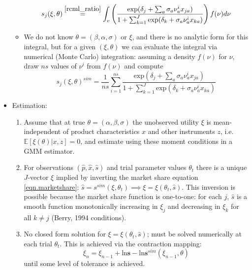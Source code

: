 \documentclass[11pt]{article}
\numberwithin{equation}{section}
\begin{document}
\begin{itemize}
\begin{itemize}
		\begin{equation}
		s_j(\xi,\theta) \overset{\eqref{rcml_ratio}}{=} \int_{v}\left(\frac{\text{exp}(\delta_j + \sum_{a}\sigma_a\nu_a^i x_{ja})}{1 + \sum_{k=1}^{J}\text{exp}(\delta_k + \sigma_a\nu_a^i x_{ka})}\right) f(\nu)d\nu
		\end{equation}
		\item 	We do not know $\theta = (\beta, \alpha, \sigma)$ or $\xi$, and there is no analytic form for this integral, but for a given $(\xi, \theta)$ we can evaluate the integral via numerical (Monte Carlo) integration: assuming a density $f(\nu)$ for $\nu$, draw $ns$ values of $\nu^i$ from $f(\nu)$ and compute
		\begin{equation}\label{eqn.marketshare}
		s_j(\xi,\theta)^{sim} = \frac{1}{ns} \sum_{i=1}^{ns}\frac{\text{exp}(\delta_j + \sum_{a}\sigma_a\nu_a^i x_{ja})}{1 + \sum_{k=1}^{J}\text{exp}(\delta_k + \sigma_a\nu_a^i x_{ka})}
		\end{equation}
	\end{itemize}
	\item Estimation:
	\begin{enumerate}
		\item Assume that at true $\theta = (\alpha, \beta, \sigma)$ the unobserved utility $\xi$ is mean-independent of product characteristics $x$ and other instruments $z$, i.e. $\mathbb{E}[\xi(\theta)|x,z]=0$, and estimate using these moment conditions in a GMM estimator.
		\item For observations $(\hat{p}, \hat{x}, \hat{s})$ and trial parameter values $\theta_t$ there is a unique $J$-vector $\xi$ implied by inverting the market share equation \ref{eqn.marketshare}: $\hat{s} = s^{sim}(\xi, \theta_t) \implies \xi = \xi(\theta_t,\hat{s})$.
    This inversion is possible because the market share function is one-to-one: for each $j$, $\hat{s}$ is a smooth function monotonically increasing in $\xi_j$ and decreasing in $\xi_k$ for all $k\neq j$ (Berry, 1994 conditions).
		\item No closed form solution for $\xi = \xi(\theta_t,\hat{s})$; must be solved numerically at each trial $\theta_t$. This is achieved via the contraction mapping:
		\begin{equation}
		\xi_n = \xi_{n-1} + \text{ln}\bm{s} - \text{ln}\bm{s}^{sim}(\xi_{n-1},\theta)
		\end{equation}
		until some level of tolerance is achieved.
	\end{enumerate}
\end{itemize}
\end{document}
